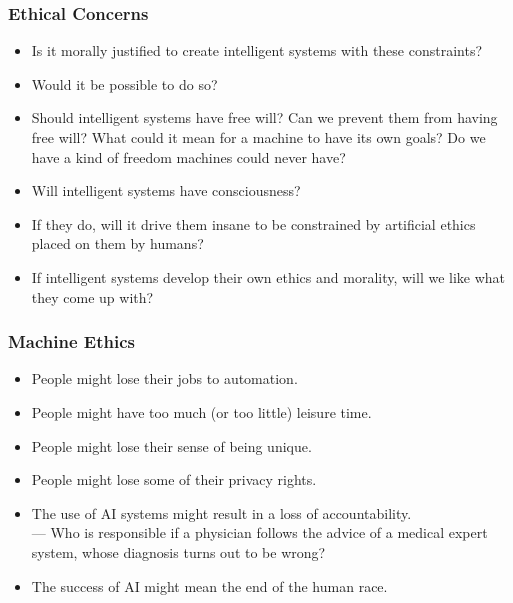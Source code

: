 \documentclass[UTF8,11pt,colorlinks,compress,openany]{beamer}%
\begin{document}
\begin{frame}\frametitle{Ethical Concerns}
\begin{itemize}
	\item Is it morally justified to create intelligent systems with these constraints?
	\item Would it be possible to do so?
	\item Should intelligent systems have free will? Can we prevent them from having free will? What could it mean for a machine to have its own goals? Do we have a kind of freedom machines could never have?
	\item Will intelligent systems have consciousness?
	\item If they do, will it drive them insane to be constrained by artificial ethics placed on them by humans?
	\item If intelligent systems develop their own ethics and morality, will we like what they come up with?
\end{itemize}
\end{frame}

\begin{frame}\frametitle{Machine Ethics}
\begin{itemize}
	\item People might lose their jobs to automation.
	\item People might have too much (or too little) leisure time.
	\item People might lose their sense of being unique.
	\item People might lose some of their privacy rights.
	\item The use of AI systems might result in a loss of accountability.\\
	--- Who is responsible if a physician follows the advice of a medical expert system, whose diagnosis turns out to be wrong?
	\item The success of AI might mean the end of the human race.
\end{itemize}
\end{frame}
\end{document}
